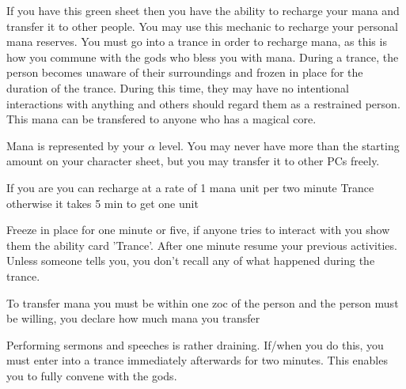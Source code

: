 \documentclass[green]{guildcamp3}
\begin{document}
	
	\name{\gManaRecharge{}}
	
	
	
	
	
	If you have this green sheet then you have the ability to recharge your mana and transfer it to other people.
	You may use this mechanic to recharge your personal mana reserves. You must go into a trance in order to recharge mana, as this is how you commune with the gods who bless you with mana. 	During a trance, the person becomes unaware of their surroundings and frozen in place for the duration of the trance. During this time, they may have no intentional interactions with anything and others should regard them as a restrained person. This mana can be transfered to anyone who has a magical core. 
	
	Mana is represented by your $\alpha$ level. You may never have more than the starting amount on your character sheet, but you may transfer it to other PCs freely.
	
	
	
	
	\begin{enum}[Directions]
		\item If you are \cPaladin{} you can recharge at a rate of 1 mana unit per two minute Trance otherwise it takes 5 min to get one unit 
		\item Freeze in place for one minute or five, if anyone tries to interact with you show them the ability card 'Trance'. After one minute resume your previous activities. Unless someone tells you, you don't recall any of what happened during the trance.
		\item To transfer mana you must be within one zoc of the person and the person must be willing, you declare how much mana you transfer
		\item Performing sermons and speeches is rather draining. If/when you do this, you must enter into a trance immediately afterwards for two minutes. This enables you to fully convene with the gods. 
	\end{enum}
	
\end{document}
